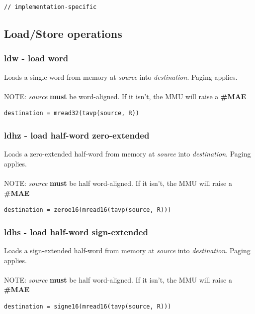 \documentclass[a4paper,10pt]{article}
\begin{document}
\begin{lstlisting}
// implementation-specific
\end{lstlisting}

\subsection{Load/Store operations}
\subsubsection{ldw - load word}
	{
		Loads a single word from memory at \emph{source} into \emph{destination}. Paging applies.
		\\\\
		NOTE: \emph{source} \textbf{must} be word-aligned. If it isn't, the MMU will raise a \textbf{\#MAE}
	}
\begin{lstlisting}
destination = mread32(tavp(source, R))
\end{lstlisting}

\subsubsection{ldhz - load half-word zero-extended}
	{
		Loads a zero-extended half-word from memory at \emph{source} into \emph{destination}. Paging applies.
		\\\\
		NOTE: \emph{source} \textbf{must} be half word-aligned. If it isn't, the MMU will raise a \textbf{\#MAE}
	}
\begin{lstlisting}
destination = zeroe16(mread16(tavp(source, R)))
\end{lstlisting}

\subsubsection{ldhs - load half-word sign-extended}
	{
		Loads a sign-extended half-word from memory at \emph{source} into \emph{destination}. Paging applies.
		\\\\
		NOTE: \emph{source} \textbf{must} be half word-aligned. If it isn't, the MMU will raise a \textbf{\#MAE}
	}
\begin{lstlisting}
destination = signe16(mread16(tavp(source, R)))
\end{lstlisting}
\end{document}
